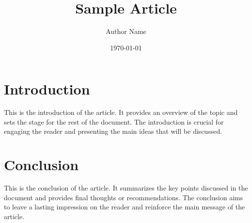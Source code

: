 \documentclass{article}
\title{Sample Article}
\author{Author Name}
\date{\today}
\begin{document}
\maketitle

\section{Introduction}
This is the introduction of the article. It provides an overview of the topic and sets the stage for the rest of the document. The introduction is crucial for engaging the reader and presenting the main ideas that will be discussed.

\section{Conclusion}
This is the conclusion of the article. It summarizes the key points discussed in the document and provides final thoughts or recommendations. The conclusion aims to leave a lasting impression on the reader and reinforce the main message of the article.
\end{document}

